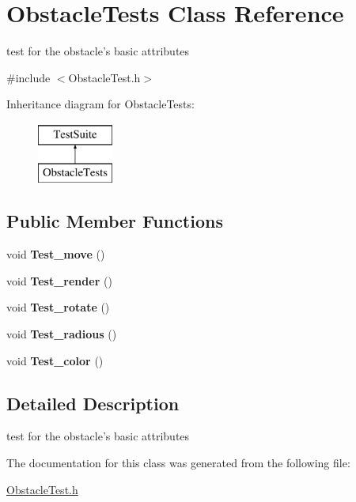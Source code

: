 \hypertarget{classObstacleTests}{\section{Obstacle\-Tests Class Reference}
\label{classObstacleTests}
}


test for the obstacle's basic attributes  




{\ttfamily \#include $<$Obstacle\-Test.\-h$>$}

Inheritance diagram for Obstacle\-Tests\-:\begin{figure}[H]
\begin{center}
\leavevmode
\includegraphics[height=2.000000cm]{classObstacleTests}
\end{center}
\end{figure}
\subsection*{Public Member Functions}
\begin{DoxyCompactItemize}
\item 
\hypertarget{classObstacleTests_ae8fd342ec510c6a32d8bd9464e34c11b}{void {\bfseries Test\-\_\-move} ()}\label{classObstacleTests_ae8fd342ec510c6a32d8bd9464e34c11b}

\item 
\hypertarget{classObstacleTests_a13d6e2e50cb059f41434e01e02e883e0}{void {\bfseries Test\-\_\-render} ()}\label{classObstacleTests_a13d6e2e50cb059f41434e01e02e883e0}

\item 
\hypertarget{classObstacleTests_a282fe4485426b3f277d5cb6cf32405ba}{void {\bfseries Test\-\_\-rotate} ()}\label{classObstacleTests_a282fe4485426b3f277d5cb6cf32405ba}

\item 
\hypertarget{classObstacleTests_a314341e9bdcdcd2fa2e73b51fdfcd07d}{void {\bfseries Test\-\_\-radious} ()}\label{classObstacleTests_a314341e9bdcdcd2fa2e73b51fdfcd07d}

\item 
\hypertarget{classObstacleTests_a11369ab95a22d9ae1a80097aff6023a1}{void {\bfseries Test\-\_\-color} ()}\label{classObstacleTests_a11369ab95a22d9ae1a80097aff6023a1}

\end{DoxyCompactItemize}


\subsection{Detailed Description}
test for the obstacle's basic attributes 

The documentation for this class was generated from the following file\-:\begin{DoxyCompactItemize}
\item 
\hyperlink{ObstacleTest_8h}{Obstacle\-Test.\-h}\end{DoxyCompactItemize}
